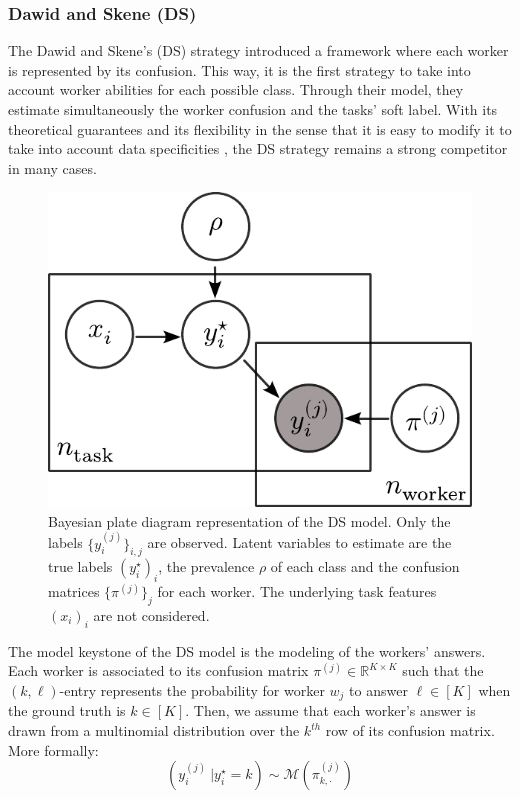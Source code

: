 \subsubsection{Dawid and Skene (DS)}
\label{subsub:ds}

The Dawid and Skene's (DS) strategy \citep{dawid_maximum_1979} introduced a framework where each worker is represented by its confusion.
This way, it is the first strategy to take into account worker abilities for each possible class.
Through their model, they estimate simultaneously the worker confusion and the tasks' soft label.
With its theoretical guarantees \citep{gao2013minimax} and its flexibility in the sense that it is easy to modify it to take into account data specificities \citep{passonneau-carpenter-2014-benefits, servajean2017crowdsourcing,sinha2018fast}, the DS strategy remains a strong competitor in many cases.

\begin{figure}[htb]
    \centering
    \includegraphics[width=.65\textwidth]{chapters/images/bayesien_plaque_ds.pdf}
    \caption{Bayesian plate diagram representation of the DS model. Only the labels $\{y_i^{(j)}\}_{i,j}$ are observed. Latent variables to estimate are the true labels $(y_i^\star)_i$, the prevalence $\rho$ of each class and the confusion matrices $\{\pi^{(j)}\}_j$ for each worker. The underlying task features $(x_i)_i$ are not considered.}
    \label{fig:plaque_ds}
\end{figure}

The model keystone of the DS model is the modeling of the workers' answers.
Each worker is associated to its confusion matrix $\pi^{(j)}\in\mathbb{R}^{K\times K}$ such that the $(k,\ell)$-entry represents the probability for worker $w_j$ to answer $\ell\in[K]$ when the ground truth is $k\in[K]$.
Then, we assume that each worker's answer is drawn from a multinomial distribution over the $k^{th}$ row of its confusion matrix.
More formally:
\begin{equation}\label{eq:ds_multinomial}
    (y_i^{(j)}\ | y_i^\star = k) \sim \mathcal{M}\left(\pi^{(j)}_{k,\cdot}\right)
\end{equation}

